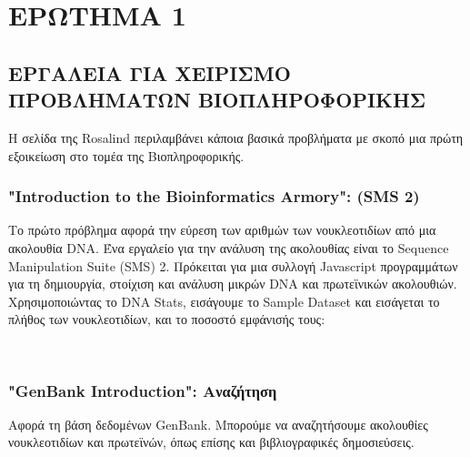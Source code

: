 \chapter{ΕΡΩΤΗΜΑ 1}

    \section{ΕΡΓΑΛΕΙΑ ΓΙΑ ΧΕΙΡΙΣΜΟ ΠΡΟΒΛΗΜΑΤΩΝ ΒΙΟΠΛΗΡΟΦΟΡΙΚΗΣ}

        Η σελίδα της Rosalind περιλαμβάνει κάποια βασικά προβλήματα με σκοπό μια πρώτη εξοικείωση στο τομέα της Βιοπληροφορικής.

    \subsection{"Introduction to the Bioinformatics Armory": (SMS 2)}
        Το πρώτο πρόβλημα αφορά την εύρεση των αριθμών των νουκλεοτιδίων από μια ακολουθία DNA.
        Ένα εργαλείο για την ανάλυση της ακολουθίας είναι το Sequence Manipulation Suite (SMS) 2.
        Πρόκειται για μια συλλογή Javascript προγραμμάτων για τη δημιουργία, στοίχιση και ανάλυση μικρών DNA και πρωτεϊνικών ακολουθιών. \cite{SMS2}
        Χρησιμοποιώντας το DNA Stats, εισάγουμε το Sample Dataset και εισάγεται το πλήθος των νουκλεοτιδίων, και το ποσοστό εμφάνισής τους:
        \vspace{-10pt}
        \begin{table}[ht] \noindent\centering\tt
        \end{table}
        \vspace{-10pt}

    \subsection{"GenBank Introduction": Αναζήτηση}
        Αφορά τη βάση δεδομένων GenBank. \cite{GenBank} Μπορούμε να αναζητήσουμε ακολουθίες νουκλεοτιδίων και πρωτεϊνών, όπως επίσης και βιβλιογραφικές δημοσιεύσεις.

